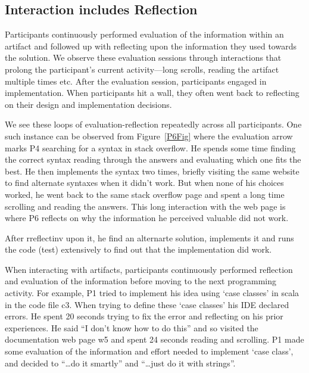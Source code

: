 
\subsection{Interaction includes Reflection}


Participants continuously performed evaluation of the information within an artifact and followed up with reflecting upon the information they used towards the solution. We observe these evaluation sessions through interactions that prolong the participant's current activity---long scrolls, reading the artifact multiple times etc. After the evaluation session, participants engaged in implementation. When participants hit a wall, they often went back to reflecting on their design and implementation decisions. 

We see these loops of evaluation-reflection repeatedly across all participants. One such instance can be observed from Figure~\ref{P6Fig} where the evaluation arrow marks P4 searching for a syntax in stack overflow. He spends some time finding the correct syntax reading through the answers and evaluating which one fits the best. He then implements the syntax two times, briefly visiting the same website to find alternate syntaxes when it didn't work. But when none of his choices worked, he went back to the same stack overflow page and spent a long time scrolling and reading the answers. This long interaction with the web page is where P6 reflects on why the information he perceived valuable did not work. 

After rreflectinv upon it, he find an alternarte solution, implements it and runs the code (test) extensively to find out that the implementation did work.

When interacting with artifacts, participants continuously performed reflection and evaluation of the information before moving to the next programming activity. For example, P1 tried to implement his idea using `case classes' in scala in the code file c3. When trying to define these `case classes' his IDE declared errors. He spent 20 seconds trying to fix the error and reflecting on his prior experiences. He said ``I don't know how to do this'' and so visited the documentation web page w5 and spent 24 seconds reading and scrolling. P1 made some evaluation of the information and effort needed to implement `case class', and decided to ``\dots do it smartly'' and ``\dots just do it with strings''.


